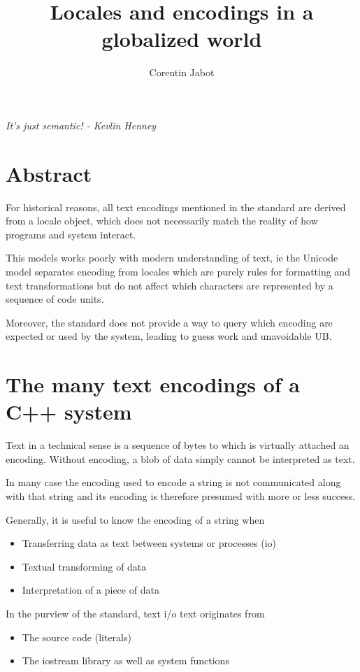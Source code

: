 \documentclass{wg21}
\title{Locales and encodings in a globalized world}
\author{Corentin Jabot}{corentin.jabot@gmail.com}
\begin{document}
\maketitle

\begin{flushright}
	\hfill \break
	\hfill \break
	\textit{It's just semantic! - Kevlin Henney}
\end{flushright}


\section{Abstract}

For historical reasons, all text encodings mentioned in the standard are derived from
a locale object, which does not necessarily match the reality of how programs and system interact.

This models works poorly with modern understanding of text, ie the Unicode model separates encoding
from locales which are purely rules for formatting and text transformations but do not affect
which characters are represented by a sequence of code units.

Moreover, the standard does not provide a way to query which encoding are expected or used by the system,
leading to guess work and unavoidable UB.

\section{The many text encodings of a C++ system}

Text in a technical sense is a sequence of bytes to which is virtually attached an encoding.
Without encoding, a blob of data simply cannot be interpreted as text.

In many case the encoding used to encode a string is not communicated along with that string and its
encoding is therefore presumed with more or less success.

Generally, it is useful to know the encoding of a string when

\begin{itemize}
	\item Transferring data as text between systems or processes (io)
	\item Textual transforming of data
	\item Interpretation of a piece of data
\end{itemize}

In the purview of the standard, text i/o text originates from
\begin{itemize}
	\item The source code (literals)
	\item The iostream library as well as system functions
\end{itemize}
\end{document}
